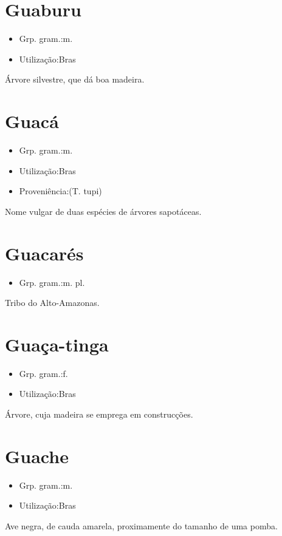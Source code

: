 \section{Guaburu}
\begin{itemize}
\item {Grp. gram.:m.}
\end{itemize}
\begin{itemize}
\item {Utilização:Bras}
\end{itemize}
Árvore silvestre, que dá boa madeira.
\section{Guacá}
\begin{itemize}
\item {Grp. gram.:m.}
\end{itemize}
\begin{itemize}
\item {Utilização:Bras}
\end{itemize}
\begin{itemize}
\item {Proveniência:(T. tupi)}
\end{itemize}
Nome vulgar de duas espécies de árvores sapotáceas.
\section{Guacarés}
\begin{itemize}
\item {Grp. gram.:m. pl.}
\end{itemize}
Tribo do Alto-Amazonas.
\section{Guaça-tinga}
\begin{itemize}
\item {Grp. gram.:f.}
\end{itemize}
\begin{itemize}
\item {Utilização:Bras}
\end{itemize}
Árvore, cuja madeira se emprega em construcções.
\section{Guache}
\begin{itemize}
\item {Grp. gram.:m.}
\end{itemize}
\begin{itemize}
\item {Utilização:Bras}
\end{itemize}
Ave negra, de cauda amarela, proximamente do tamanho de uma pomba.
